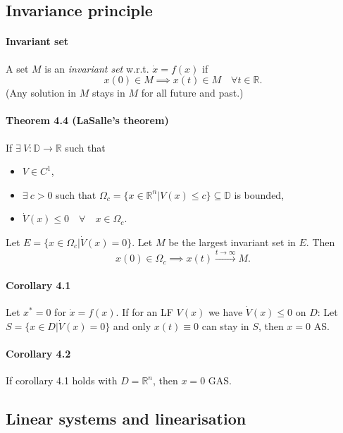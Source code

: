 \subsection{Invariance principle}
\paragraph{Invariant set} A set $M$ is an \emph{invariant set} w.r.t. $\dot{x} = f(x)$ if
\begin{equation}
	x(0) \in M \implies x(t) \in M \quad \forall t \in \mathbb{R}.
\end{equation}
(Any solution in $M$ stays in $M$ for all future and past.)

\paragraph{Theorem 4.4 (LaSalle's theorem)}
If $\exists \: V : \mathbb{D} \to \mathbb{R}$ such that
\begin{itemize}
	\item $V \in C^1$,
	\item $\exists \: c > 0$ such that $\Omega_c = \{x \in \mathbb{R}^n | V(x) \leq c \} \subseteq \mathbb{D}$ is bounded,
	\item $\dot{V}(x) \leq 0 \quad \forall \quad x \in \Omega_c$.
\end{itemize}
Let $E = \{ x \in \Omega_c | \dot{V}(x) = 0 \}$. Let $M$ be the largest invariant set in $E$. Then
\begin{equation}
	x(0) \in \Omega_c \implies x(t) \xrightarrow{t \to \infty} M.
\end{equation}

\paragraph{Corollary 4.1} Let $x^* = 0$ for $\dot{x} = f(x)$. If for an LF $V(x)$ we have $\dot{V}(x) \leq 0$ on $D$: Let $S = \{ x \in D | \dot{V}(x) = 0 \}$ and only $x(t) \equiv 0$ can stay in $S$, then $x = 0$ AS.

\paragraph{Corollary 4.2} If corollary 4.1 holds with $D = \mathbb{R}^n$, then $x = 0$ GAS.

\subsection{Linear systems and linearisation}

